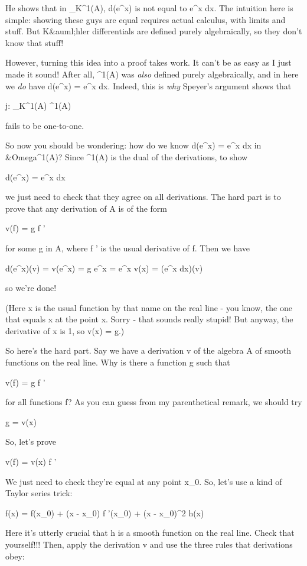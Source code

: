 He shows that in \Omega _{K}^{1}(A), d(e^{x})
is not equal to e^{x} dx.  The intuition here is simple:
showing these guys are equal requires actual calculus, with limits and
stuff.  But K&auml;hler differentials are defined purely
algebraically, so they don't know that stuff!

However, turning this idea into a proof takes work.  It can't be as
easy as I just made it sound!  After all, \Omega ^{1}(A) was
\emph{also} defined purely algebraically, and in here we \emph{do} have
d(e^{x}) = e^{x} dx.  Indeed, this is \emph{why} Speyer's
argument shows that

j: \Omega _{K}^{1}(A) \to  \Omega ^{1}(A)

fails to be one-to-one.

So now you should be wondering: how do we know d(e^{x}) =
e^{x} dx in &Omega^{1}(A)?  Since
\Omega ^{1}(A) is the dual of the derivations, to show

d(e^{x}) = e^{x} dx

we just need to check that they agree on all derivations.  The hard
part is to prove that any derivation of A is of the form

v(f) = g f '

for some g in A, where f ' is the usual derivative of f.  Then we have

d(e^{x})(v) = v(e^{x}) = g e^{x} =
e^{x} v(x) = (e^{x} dx)(v)

so we're done!  

(Here x is the usual function by that name on the real line - you
know, the one that equals x at the point x.  Sorry - that sounds
really stupid!  But anyway, the derivative of x is 1, so v(x) = g.)

So here's the hard part.  Say we have a derivation v of the algebra A
of smooth functions on the real line.  Why is there a function g such
that 

v(f) = g f ' 

for all functions f?  As you can guess from my parenthetical remark,
we should try

g = v(x)

So, let's prove

v(f) = v(x) f ' 

We just need to check they're equal at any point x_{0}.  So, let's 
use a kind of Taylor series trick:

f(x) = f(x_{0}) + (x - x_{0}) f '(x_{0})
+ (x - x_{0})^{2} h(x)

Here it's utterly crucial that h is a smooth function on the real
line.  Check that yourself!!!  Then, apply the derivation v and use 
the three rules that derivations obey:

